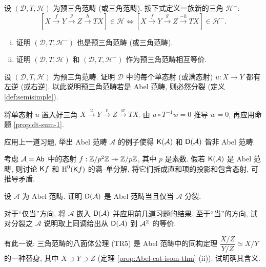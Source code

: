 \begin{Exercises}
	\item 设 $(\mathcal{D}, T, \mathcal{H})$ 为预三角范畴 (或三角范畴). 按下式定义一族新的三角 $\mathcal{H}^-$:
	\[ [X \xrightarrow{f} Y \xrightarrow{g} Z \xrightarrow{h} TX] \in \mathcal{H} \iff [X \xrightarrow{f} Y \xrightarrow{g} Z \xrightarrow{-h} TX] \in \mathcal{H}^- . \]
	\begin{enumerate}[(i)]
		\item 证明 $(\mathcal{D}, T, \mathcal{H}^-)$ 也是预三角范畴 (或三角范畴).
		\item 证明 $(\mathcal{D}, T, \mathcal{H})$ 和 $(\mathcal{D}, T, \mathcal{H}^-)$ 作为预三角范畴相互等价.
	\end{enumerate}

	\item 设 $(\mathcal{D}, T, \mathcal{H})$ 为预三角范畴. 证明 $\mathcal{D}$ 中的每个单态射 (或满态射) $u: X \to Y$ 都有左逆 (或右逆). 以此说明预三角范畴若是 Abel 范畴, 则必然分裂 (定义 \ref{def:semisimple}).
	
	\begin{hint}
		将单态射 $u$ 置入好三角 $X \xrightarrow{u} Y \xrightarrow{v} Z \xrightarrow{w} TX$. 由 $u \circ T^{-1}w = 0$ 推导 $w = 0$, 再应用命题 \ref{prop:dt-sum-1}.
	\end{hint}

	\item 应用上一道习题, 举出 Abel 范畴 $\mathcal{A}$ 的例子使得 $\mathsf{K}(\mathcal{A})$ 和 $\mathsf{D}(\mathcal{A})$ 皆非 Abel 范畴.

	\begin{hint}
		考虑 $\mathcal{A} = \mathsf{Ab}$ 中的态射 $f: \mathbb{Z}/p^2 \mathbb{Z} \twoheadrightarrow \mathbb{Z}/p \mathbb{Z}$, 其中 $p$ 是素数. 假若 $\mathsf{K}(\mathcal{A})$ 是 Abel 范畴, 则讨论 $\mathsf{K}f$ 和 $\operatorname{H}^0(\mathsf{K}f)$ 的满--单分解, 将它们拆成直和项的投影和包含态射, 可推导矛盾.
	\end{hint}

	\item 设 $\mathcal{A}$ 为 Abel 范畴. 证明 $\mathsf{D}(\mathcal{A})$ 是 Abel 范畴当且仅当 $\mathcal{A}$ 分裂.

	\begin{hint}
		对于``仅当''方向, 将 $\mathcal{A}$ 嵌入 $\mathsf{D}(\mathcal{A})$ 并应用前几道习题的结果. 至于``当''的方向, 试对分裂之 $\mathcal{A}$ 说明取上同调给出从 $\mathsf{D}(\mathcal{A})$ 到 $\mathcal{A}^{\mathbb{Z}}$ 的等价.
	\end{hint}

	\item 有此一说: 三角范畴的八面体公理 (TR5) 是 Abel 范畴中的同构定理 $\dfrac{X/Z}{Y/Z} \simeq X/Y$ 的一种替身, 其中 $X \supset Y \supset Z$ (定理 \ref{prop:Abel-cat-isom-thm} (ii)). 试明确其含义.


\end{Exercises}

